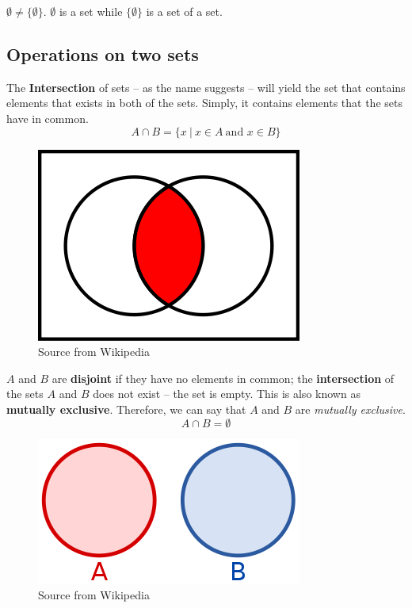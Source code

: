 \documentclass[../setup.tex]{subfiles}
\begin{document}
\begin{remark}
$\emptyset \neq \{\emptyset\}$. $\emptyset$ is a set while $\{\emptyset\}$ is a set of a set.
\end{remark}



\subsection{Operations on two sets}
\begin{theorem}
The \textbf{Intersection} of sets -- as the name suggests -- will yield the set that contains elements that exists in both of the sets. Simply, it contains elements that the sets have in common.
\[A\cap B = \{x\ |\ x\in A\ \text{and } x\in B \}\]
\begin{figure}[H]
    \centering
    \includegraphics[scale=0.6]{Venn Diagram-Intersection.png}
    \caption{Source from Wikipedia}
\end{figure}
\end{theorem}

\begin{theorem}[Disjoint]
$A$ and $B$ are \textbf{disjoint} if they have no elements in common; the \textbf{intersection} of the sets $A$ and $B$ does not exist -- the set is empty. This is also known as \textbf{mutually exclusive}. Therefore, we can say that $A$ and $B$ are \textit{mutually exclusive}.
\[A\cap B = \emptyset\]
\begin{figure}[H]
    \centering
    \includegraphics[scale=0.6]{Venn Diagram-Disjoint.png}
    \caption{Source from Wikipedia}
\end{figure}
\end{theorem}
\end{document}
